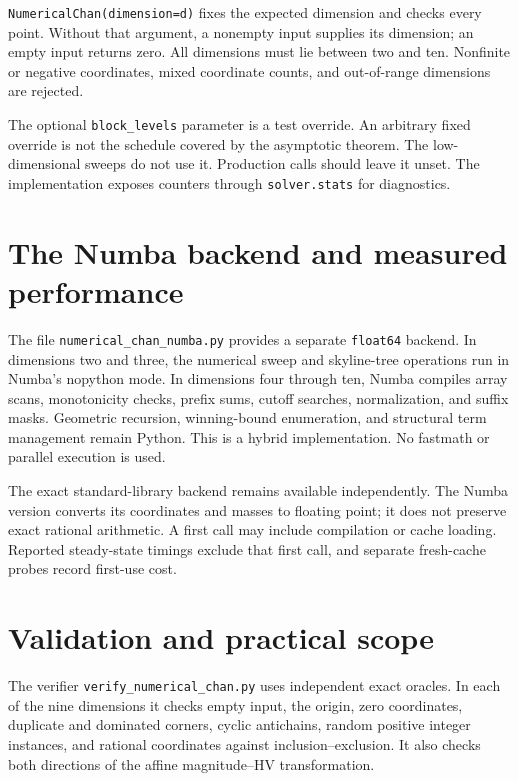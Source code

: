 \documentclass[12pt,a4paper]{article}
\newcommand{\1}{\mathbf1}
\begin{document}
\texttt{NumericalChan(dimension=d)} fixes the expected dimension and
checks every point. Without that argument, a nonempty input supplies its
dimension; an empty input returns zero. All dimensions must lie between
two and ten. Nonfinite or negative coordinates, mixed coordinate counts,
and out-of-range dimensions are rejected.

The optional \texttt{block\_levels} parameter is a test override. An
arbitrary fixed override is not the schedule covered by the asymptotic
theorem. The low-dimensional sweeps do not use it. Production calls should
leave it unset. The implementation exposes counters through
\texttt{solver.stats} for diagnostics.

\section{The Numba backend and measured performance}\label{sec:numba}
The file \texttt{numerical\_chan\_numba.py} provides a separate
\texttt{float64} backend. In dimensions two and three, the numerical sweep
and skyline-tree operations run in Numba's nopython mode. In dimensions
four through ten, Numba compiles array scans, monotonicity checks, prefix
sums, cutoff searches, normalization, and suffix masks. Geometric recursion,
winning-bound enumeration, and structural term management remain Python.
This is a hybrid implementation. No fastmath or parallel execution is used.

The exact standard-library backend remains available independently.
The Numba version converts its coordinates and masses to floating point;
it does not preserve exact rational arithmetic. A first call may include
compilation or cache loading. Reported steady-state timings exclude that
first call, and separate fresh-cache probes record first-use cost.



\section{Validation and practical scope}\label{sec:validation}
The verifier \texttt{verify\_numerical\_chan.py} uses independent exact
oracles. In each of the nine dimensions it checks empty input, the origin,
zero coordinates, duplicate and dominated corners, cyclic antichains,
random positive integer instances, and rational coordinates against
inclusion--exclusion. It also checks both directions of the affine
magnitude--HV transformation.
\end{document}
